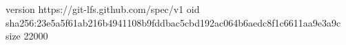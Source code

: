 version https://git-lfs.github.com/spec/v1
oid sha256:23e5a5f61ab216b4941108b9fddbac5cbd192ac064b6aedc8f1c6611aa9e3a9c
size 22000
